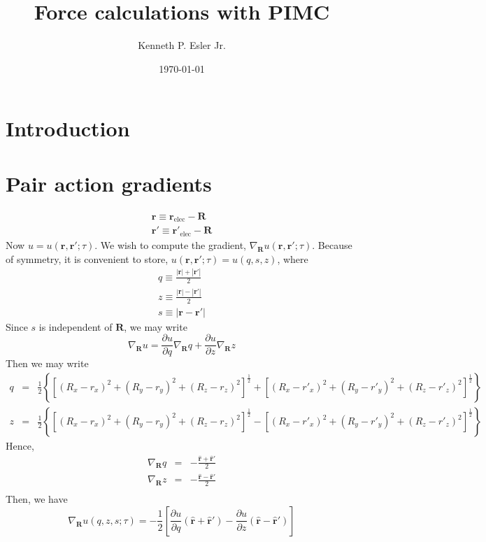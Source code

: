 \documentclass{article}
\title{Force calculations with PIMC}
\author{Kenneth P. Esler Jr.}
\date{\today}
\newcommand{\vr}{\mathbf{r}}
\newcommand{\vrp}{\mathbf{r}'}
\newcommand{\vR}{\mathbf{R}}
\begin{document}
\maketitle

\section{Introduction}

\section{Pair action gradients}

\begin{eqnarray}
\vr \equiv   \vr_\text{elec} - \vR \\
\vrp \equiv  \vrp_\text{elec} - \vR
\end{eqnarray}
Now $u = u(\vr,\vrp;\tau)$.  We wish to compute the gradient,
$\nabla_\vR u(\vr, \vrp; \tau)$.  Because of symmetry, it is
convenient to store, $u(\vr, \vrp;\tau) = u(q,s,z)$, where
\begin{eqnarray}
q \equiv \frac{|\vr| + |\vrp|}{2} \\
z \equiv \frac{|\vr| - |\vrp|}{2} \\
s \equiv |\vr - \vrp|
\end{eqnarray}
Since $s$ is independent of $\vR$, we may write
\begin{equation}
\nabla_\vR u = \frac{\partial u}{\partial q} \nabla_\vR q +
\frac{\partial u}{\partial z} \nabla_\vR z
\end{equation}
Then we may write
\begin{eqnarray}
q & = & \frac{1}{2} \left\{\left[ (R_x - r_x)^2 + (R_y - r_y)^2 +
  (R_z-r_z)^2\right]^{\frac{1}{2}}+ 
\left[(R_x-r'_x)^2 +(R_y-r'_y)^2 +
  (R_z-r'_z)^2\right]^\frac{1}{2}\right\} \\
z & = &\frac{1}{2} \left\{\left[ (R_x - r_x)^2 + (R_y - r_y)^2 +
  (R_z-r_z)^2\right]^{\frac{1}{2}}- 
\left[(R_x-r'_x)^2 +(R_y-r'_y)^2 +
  (R_z-r'_z)^2\right]^\frac{1}{2}\right\} 
\end{eqnarray}
Hence,
\begin{eqnarray}
  \nabla_\vR q & = & -\frac{\hat{\vr} + \hat{\vr}'}{2} \\
  \nabla_\vR z & = & -\frac{\hat{\vr} - \hat{\vr}'}{2} \\
\end{eqnarray}
Then, we have
\begin{equation}
\nabla_{\vR} u(q,z,s;\tau) = -\frac{1}{2}\left[\frac{\partial u}{\partial q}
\left(\hat{\vr} + \hat{\vr}'\right)
-\frac{\partial u}{\partial z} \left(\hat{\vr} -\hat{\vr}'\right) \right]
\end{equation}
\end{document}
